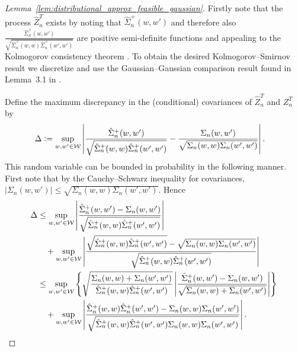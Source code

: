 \begin{proof}[Lemma~\ref{lem:distributional_approx_feasible_gaussian}]

  Firstly note that the process $\hat Z_n^T$ exists
  by noting that $\hat \Sigma_n^+(w,w')$ and therefore also
  $\frac{\hat \Sigma_n^+(w,w')}
  {\sqrt{\hat \Sigma_n^+(w,w) \hat \Sigma_n^+(w',w')}}$
  are positive semi-definite
  functions and appealing to the
  Kolmogorov consistency theorem \citep{gine2021mathematical}.
  To obtain the desired Kolmogorov--Smirnov result we discretize and
  use the Gaussian--Gaussian comparison result found in
  Lemma~3.1 in \citet{chernozhukov2013gaussian}.


  Define the maximum discrepancy in the (conditional) covariances
  of $\hat Z_n^T$ and $Z_n^T$ by
  \begin{align*}
    \Delta
    &\vcentcolon=
    \sup_{w, w' \in \mathcal{W}}
    \left|
    \frac{\hat \Sigma_n^+(w,w')}
    {\sqrt{\hat \Sigma_n^+(w,w) \hat \Sigma_n^+(w',w')}}
    - \frac{\Sigma_n(w,w')}
    {\sqrt{\Sigma_n(w,w) \Sigma_n(w',w')}}
    \right|.
  \end{align*}
  This random variable can be bounded in probability
  in the following manner.
  First note that by the Cauchy--Schwarz inequality
  for covariances,
  $|\Sigma_n(w,w')| \leq
  \sqrt{\Sigma_n(w,w) \Sigma_n(w',w')}$.
  Hence
  \begin{align*}
    \Delta
    &\leq
    \sup_{w, w' \in \mathcal{W}}
    \left|
    \frac{\hat \Sigma_n^+(w,w') - \Sigma_n(w,w')}
    {\sqrt{\hat \Sigma_n^+(w,w) \hat \Sigma_n^+(w',w')}}
    \right| \\
    &\quad+
    \sup_{w, w' \in \mathcal{W}}
    \left|
    \frac{\sqrt{\hat \Sigma_n^+(w,w) \hat \Sigma_n^+(w',w')}
      - \sqrt{\Sigma_n(w,w) \Sigma_n(w',w')}}
    {\sqrt{\hat \Sigma_n^+(w,w) \hat \Sigma_n^+(w',w')}}
    \right| \\
    &\leq
    \sup_{w, w' \in \mathcal{W}}
    \left\{
    \sqrt{\frac{\Sigma_n(w,w) + \Sigma_n(w',w')}
      {\hat \Sigma_n^+(w,w) \hat \Sigma_n^+(w',w')}}
    \left|
    \frac{\hat \Sigma_n^+(w,w') - \Sigma_n(w,w')}
    {\sqrt{\Sigma_n(w,w) + \Sigma_n(w',w')}}
    \right|
    \right\} \\
    &\quad+
    \sup_{w, w' \in \mathcal{W}}
    \left|
    \frac{\hat \Sigma_n^+(w,w)\hat \Sigma_n^+(w',w')
      - \Sigma_n(w,w) \Sigma_n(w',w')}
    {\sqrt{\hat \Sigma_n^+(w,w) \hat \Sigma_n^+(w',w')
        \Sigma_n(w,w) \Sigma_n(w',w')}}
    \right|.
  \end{align*}

\end{proof}
